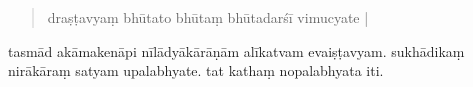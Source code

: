 \documentclass[12pt]{article}
\begin{document}
\begin{quote}
	draṣṭavyaṃ\footnoteB{
		draṣṭavyaṃ] \EDD ; draṣṭavya \MS
	} bhūtato bhūtaṃ bhūtadarśī vimucyate |
\end{quote}

tasmād akāmakenāpi nīlādyākārāṇām alīkatvam evaiṣṭavyam. sukhādikaṃ nirākāraṃ\footnoteB{
	nirākāraṃ] \MS\ \EDD ; rnam pa brdzun pa \TIB\ (alīkākāraṃ)
} satyam upalabhyate. tat kathaṃ nopalabhyata iti.

% 
 
\end{document}
